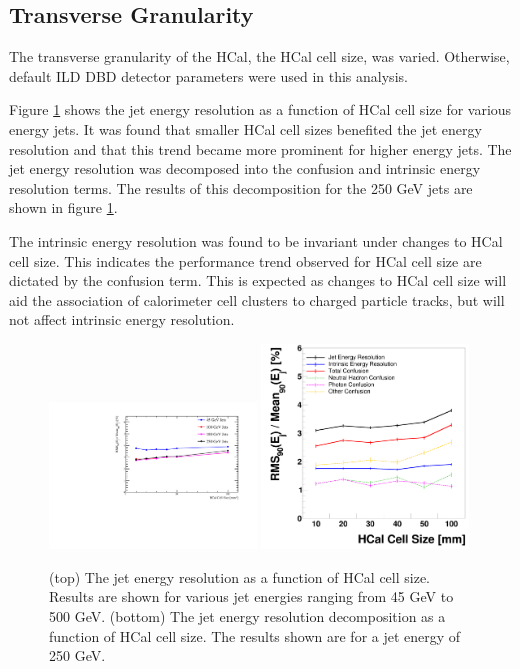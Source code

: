 \documentclass[final,3p,times,twocolumn]{elsarticle}
\begin{document}
\subsection{Transverse Granularity}
The transverse granularity of the HCal, the HCal cell size, was varied.  Otherwise, default ILD DBD detector parameters were used in this analysis.

Figure \ref{HCalCellSize} shows the jet energy resolution as a function of HCal cell size for various energy jets.  It was found that smaller HCal cell sizes benefited the jet energy resolution and that this trend became more prominent for higher energy jets.  The jet energy resolution was decomposed into the confusion and intrinsic energy resolution terms.  The results of this decomposition for the 250 GeV jets are shown in figure \ref{HCalCellSize}.

The intrinsic energy resolution was found to be invariant under changes to HCal cell size.  This indicates the performance trend observed for HCal cell size are dictated by the confusion term.  This is expected as changes to HCal cell size will aid the association of calorimeter cell clusters to charged particle tracks, but will not affect intrinsic energy resolution.

\begin{figure}[!h]
  \begin{center}
     \includegraphics[width=0.49\textwidth]{6_HCalParamScan/JER_vs_HCalCellSize.pdf}
     \includegraphics[width=0.49\textwidth]{JERBreakdownvsHCalCellSize500GeVDiJetHCalTC10ns.png}
     \caption{ (top) The jet energy resolution as a function of HCal cell size.  Results are shown for various jet energies ranging from 45 GeV to 500 GeV.  (bottom) The jet energy resolution decomposition as a function of HCal cell size.  The results shown are for a jet energy of 250 GeV.  \label{HCalCellSize}}
  \end{center}
\end{figure}
\end{document}
